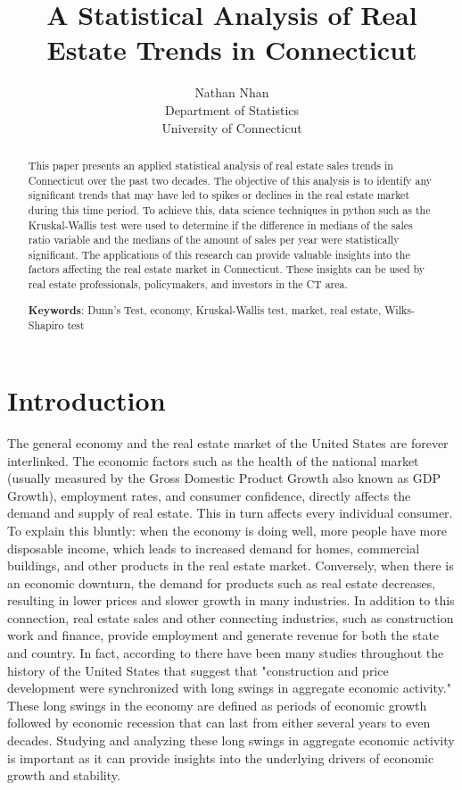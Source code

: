 \documentclass[12pt]{article}
\title{A Statistical Analysis of Real Estate Trends in Connecticut}
\author{Nathan Nhan\\
  Department of Statistics\\
  University of Connecticut
}
\begin{document}
\maketitle

\begin{abstract}
This paper presents an applied statistical analysis of real estate sales trends in Connecticut over the past two decades. The objective of this analysis is to identify any significant trends that may have led to spikes or declines in the real estate market during this time period. To achieve this, data science techniques in python such as the Kruskal-Wallis test were used to determine if the difference in medians of the sales ratio variable and the medians of the amount of sales per year were statistically significant. The applications of this research can provide valuable insights into the factors affecting the real estate market in Connecticut. These insights can be used by real estate professionals, policymakers, and investors in the CT area.

\noindent\textbf{Keywords}: Dunn's Test, economy, Kruskal-Wallis test, market, real estate, Wilks-Shapiro test
\end{abstract}



\newpage
\section{Introduction}
\label{sec:intro}

The general economy and the real estate market of the United States are forever interlinked. The economic factors such as the health of the national market (usually measured by the Gross Domestic Product Growth also known as GDP Growth), employment rates, and consumer confidence, directly affects the demand and supply of real estate. This in turn affects every individual consumer. To explain this bluntly: when the economy is doing well, more people have more disposable income, which leads to increased demand for homes, commercial buildings, and other products in the real estate market. Conversely, when there is an economic downturn, the demand for products such as real estate decreases, resulting in lower prices and slower growth in many industries. In addition to this connection, real estate sales and other connecting industries, such as construction work and finance, provide employment and generate revenue for both the state and country. In fact, according to \citep{Quigley} there have been many studies throughout the history of the United States that suggest that "construction and price development were synchronized with long swings in aggregate economic activity." These long swings in the economy are defined as periods of economic growth followed by economic recession that can last from either several years to even decades. Studying and analyzing these long swings in aggregate economic activity is important as it can provide insights into the underlying drivers of economic growth and stability. 
\end{document}
